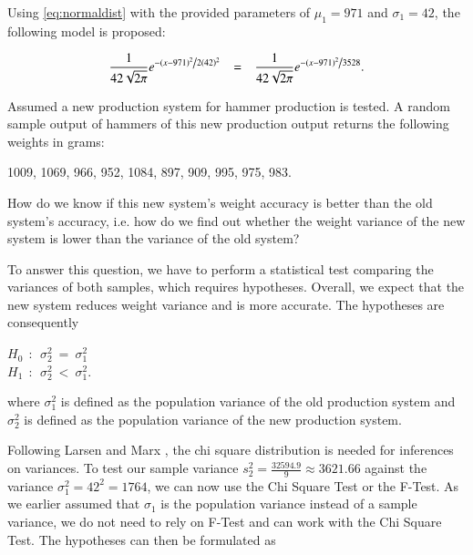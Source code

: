 Using \eqref{eq:normaldist} with the provided parameters of $\mu_1 = 971$ and $\sigma_1 = 42$, the following model is proposed: 

\begin{equation} \frac{1}{{42 \sqrt {2\pi } }}e^{{{ - \left( {x - 971 } \right)^2 } \mathord{\left/ {\vphantom {{ - \left( {x - 971 } \right)^2 } {2(42) ^2 }}} \right. \kern-\nulldelimiterspace}{2(42) ^2 }}} ~~~=~~~ \frac{1}{{42 \sqrt {2\pi } }}e^{{{ - \left( {x - 971 } \right)^2 } \mathord{\left/ {\vphantom {{ - \left( {x - 971 } \right)^2 } {7056 }}} \right. \kern-\nulldelimiterspace}{3528 }}}.
\label{eq:normaldistadapted}
\end{equation}



Assumed a new production system for hammer production is tested. A random sample output of hammers of this new production output returns the following weights in grams: \\

\begin{center}
    1009, 1069, 966, 952, 1084, 897, 909, 995, 975, 983.
\end{center}

How do we know if this new system's weight accuracy is better than the old system's accuracy, i.e. how do we find out whether the weight variance of the new system is lower than the variance of the old system?

To answer this question, we have to perform a statistical test comparing the variances of both samples, which requires hypotheses. Overall, we expect that the new system reduces weight variance and is more accurate. The hypotheses are consequently 

\begin{center}
$H_0~~:~~ \sigma^2_2~=~\sigma^2_1$\\ 
$H_1~~:~~ \sigma^2_2~<~\sigma^2_1$.
\end{center}

where $\sigma^2_1$ is defined as the population variance of the old production system and $\sigma^2_2$ is defined as the population variance of the new production system.

Following Larsen and Marx \cite[Chapter 7.5]{larsen2005introduction}, the chi square distribution is needed for inferences on variances. To test our sample variance $s_2^2 = \frac{32594.9}{9} \approx 3621.66 $ against the variance $\sigma^2_1 = 42^2 = 1764$, we can now use the Chi Square Test or the F-Test. As we earlier assumed that $\sigma_1$ is the population variance instead of a sample variance, we do not need to rely on F-Test and can work with the Chi Square Test. The hypotheses can then be formulated as 

